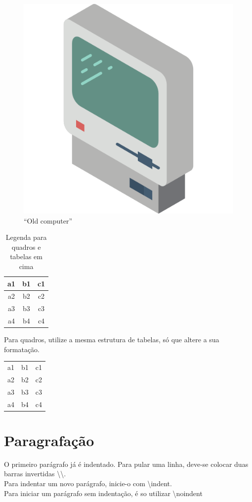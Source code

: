 \begin{figure}[htb]
	\centering
    \includegraphics[scale=0.20]{assets/072-old-computer} %
	\caption{``Old computer''} 
\end{figure}

\begin{table}[htb]
\caption{Legenda para quadros e tabelas em cima}
\begin{tabular}{|c|c|c|}
\hline
a1 & b1 & c1 \\ \hline
a2 & b2 & c2 \\ \hline
a3 & b3 & c3 \\ \hline
a4 & b4 & c4 \\ \hline
\end{tabular}
\end{table}

Para quadros, utilize a mesma estrutura de tabelas, só que altere a sua formatação.
\begin{quadro}[htb]
\caption{\label{quadro_modelo}Legenda do quadro}
\begin{tabular}{ c c c }
a1 & b1 & c1 \\ 
a2 & b2 & c2 \\ 
a3 & b3 & c3 \\ 
a4 & b4 & c4 \\ 
\end{tabular}
\end{quadro}

\section{Paragrafação}
O primeiro parágrafo já é indentado. Para pular uma linha, deve-se colocar duas barras invertidas \textbackslash \textbackslash. \\
\indent Para indentar um novo parágrafo, inicie-o com \textbackslash indent.\\
\noindent Para iniciar um parágrafo sem indentação, é so utilizar \textbackslash noindent


